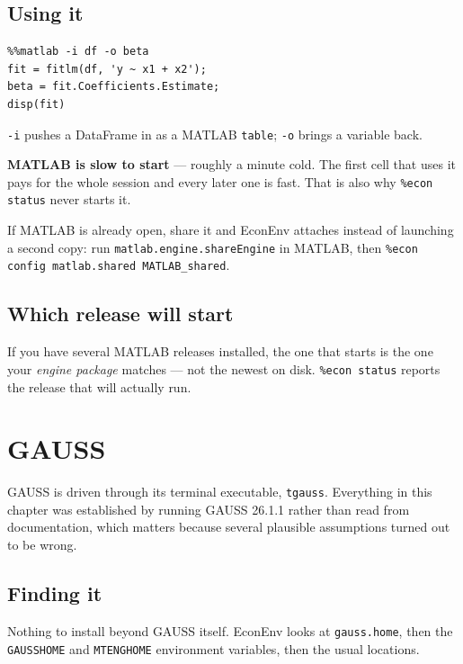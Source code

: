 \documentclass[11pt,a4paper]{report}
\begin{document}
\section{Using it}

\begin{lstlisting}
%%matlab -i df -o beta
fit = fitlm(df, 'y ~ x1 + x2');
beta = fit.Coefficients.Estimate;
disp(fit)
\end{lstlisting}

\texttt{-i} pushes a DataFrame in as a MATLAB \texttt{table}; \texttt{-o} brings
a variable back.

\begin{note}
\textbf{MATLAB is slow to start} --- roughly a minute cold. The first cell that
uses it pays for the whole session and every later one is fast. That is also why
\texttt{\%econ status} never starts it.

If MATLAB is already open, share it and EconEnv attaches instead of launching a
second copy: run \texttt{matlab.engine.shareEngine} in MATLAB, then
\texttt{\%econ config matlab.shared MATLAB\_shared}.
\end{note}

\section{Which release will start}

If you have several MATLAB releases installed, the one that starts is the one
your \emph{engine package} matches --- not the newest on disk.
\texttt{\%econ status} reports the release that will actually run.


\chapter{GAUSS}

GAUSS is driven through its terminal executable, \texttt{tgauss}. Everything in
this chapter was established by running GAUSS 26.1.1 rather than read from
documentation, which matters because several plausible assumptions turned out
to be wrong.

\section{Finding it}

Nothing to install beyond GAUSS itself. EconEnv looks at
\texttt{gauss.home}, then the \texttt{GAUSSHOME} and \texttt{MTENGHOME}
environment variables, then the usual locations.
\end{document}
